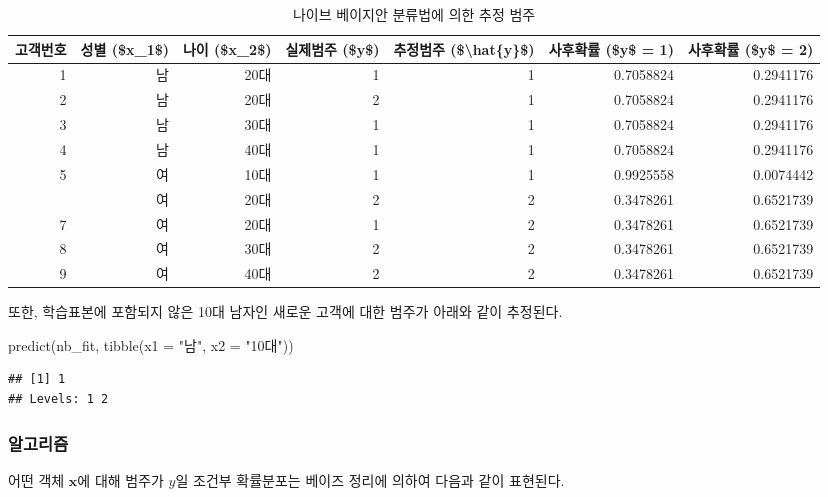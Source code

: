\documentclass[
]{book}
\newenvironment{Shaded}{\begin{snugshade}}{\end{snugshade}}
\newcommand{\AttributeTok}[1]{\textcolor[rgb]{0.77,0.63,0.00}{#1}}
\newcommand{\FunctionTok}[1]{\textcolor[rgb]{0.00,0.00,0.00}{#1}}
\newcommand{\NormalTok}[1]{#1}
\newcommand{\StringTok}[1]{\textcolor[rgb]{0.31,0.60,0.02}{#1}}
\begin{document}
\begin{table}

\caption{\label{tab:naive-bayes-posterior}나이브 베이지안 분류법에 의한 추정 범주}
\centering
\begin{tabular}[t]{rrrrrrr}
\toprule
고객번호 & 성별 (\$x\_1\$) & 나이 (\$x\_2\$) & 실제범주 (\$y\$) & 추정범주 (\$\textbackslash{}hat\{y\}\$) & 사후확률 (\$y\$ = 1) & 사후확률 (\$y\$ = 2)\\
\midrule
1 & 남 & 20대 & 1 & 1 & 0.7058824 & 0.2941176\\
2 & 남 & 20대 & 2 & 1 & 0.7058824 & 0.2941176\\
3 & 남 & 30대 & 1 & 1 & 0.7058824 & 0.2941176\\
4 & 남 & 40대 & 1 & 1 & 0.7058824 & 0.2941176\\
5 & 여 & 10대 & 1 & 1 & 0.9925558 & 0.0074442\\
\addlinespace
6 & 여 & 20대 & 2 & 2 & 0.3478261 & 0.6521739\\
7 & 여 & 20대 & 1 & 2 & 0.3478261 & 0.6521739\\
8 & 여 & 30대 & 2 & 2 & 0.3478261 & 0.6521739\\
9 & 여 & 40대 & 2 & 2 & 0.3478261 & 0.6521739\\
\bottomrule
\end{tabular}
\end{table}

또한, 학습표본에 포함되지 않은 10대 남자인 새로운 고객에 대한 범주가 아래와 같이 추정된다.

\begin{Shaded}
\begin{Highlighting}[]
\FunctionTok{predict}\NormalTok{(nb\_fit, }\FunctionTok{tibble}\NormalTok{(}\AttributeTok{x1 =} \StringTok{"남"}\NormalTok{, }\AttributeTok{x2 =} \StringTok{"10대"}\NormalTok{))}
\end{Highlighting}
\end{Shaded}

\begin{verbatim}
## [1] 1
## Levels: 1 2
\end{verbatim}

\hypertarget{naive-bayes-algorithm}{%
\subsubsection{알고리즘}\label{naive-bayes-algorithm}}

어떤 객체 \(\mathbf{x}\)에 대해 범주가 \(y\)일 조건부 확률분포는 베이즈 정리에 의하여 다음과 같이 표현된다.
\end{document}
